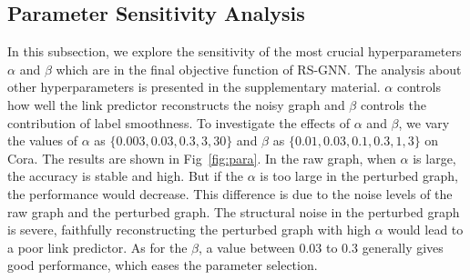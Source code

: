 \subsection{Parameter Sensitivity Analysis}
\label{Sec:para_analysis}
In this subsection, we explore the sensitivity of the most crucial hyperparameters $\alpha$ and $\beta$ which are in the final objective function of RS-GNN. The analysis about other hyperparameters is presented in the supplementary material. $\alpha$ controls how well the link predictor reconstructs the noisy graph and $\beta$ controls the contribution of label smoothness. To investigate the effects of $\alpha$ and $\beta$, we vary the values of $\alpha$ as $\{0.003, 0.03, 0.3, 3, 30\}$ and $\beta$ as $\{0.01, 0.03, 0.1, 0.3, 1, 3\}$ on Cora. The results are shown in Fig~\ref{fig:para}. In the raw graph, when $\alpha$ is large, the accuracy is stable and high. But if the $\alpha$ is too large in the perturbed graph, the performance would decrease. This difference is due to the noise levels of the raw graph and the perturbed graph. The structural noise in the perturbed graph is severe, faithfully reconstructing the perturbed graph with high $\alpha$ would lead to a poor link predictor. As for the $\beta$, a value between 0.03 to 0.3 generally gives good performance, which eases the parameter selection.